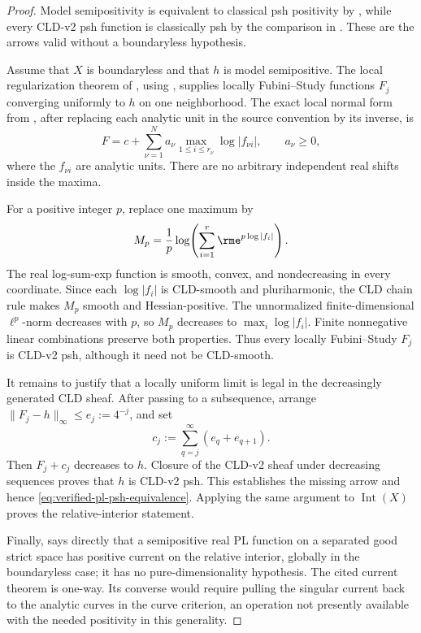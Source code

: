 \begin{proof}
Model semipositivity is equivalent to classical psh positivity by
\cite[Theorem~4.3]{GR25Classical}, while every CLD-v2 psh function is
classically psh by the comparison in \cite[\S1.2]{GR25Classical}.  These are
the arrows valid without a boundaryless hypothesis.

Assume that \(X\) is boundaryless and that \(h\) is model semipositive.  The
local regularization theorem of \cite[Introduction and Theorem~5.3]{GR25PL},
using \cite[Proposition~7.10]{GJR26}, supplies locally Fubini--Study functions
\(F_j\) converging uniformly to \(h\) on one neighborhood.  The exact local
normal form from \cite[\S7.9]{GJR26}, after replacing each analytic unit in
the source convention by its inverse, is
\[
 F=c+\sum_{\nu=1}^{N}a_\nu
       \max_{1\leq i\leq r_\nu}\log|f_{\nu i}|,
 \qquad a_\nu\geq0,
\]
where the \(f_{\nu i}\) are analytic units.  There are no arbitrary
independent real shifts inside the maxima.

For a positive integer \(p\), replace one maximum by
\[
 M_p=\frac1p\log\!\left(
             \sum_{i=1}^{r}\rme^{p\log|f_i|}\right).
\]
The real log-sum-exp function is smooth, convex, and nondecreasing in every
coordinate.  Since each \(\log|f_i|\) is CLD-smooth and pluriharmonic, the CLD
chain rule makes \(M_p\) smooth and Hessian-positive.  The unnormalized
finite-dimensional \(\ell^p\)-norm decreases with \(p\), so \(M_p\) decreases
to \(\max_i\log|f_i|\).  Finite nonnegative linear combinations preserve both
properties.  Thus every locally Fubini--Study \(F_j\) is CLD-v2 psh, although
it need not be CLD-smooth.

It remains to justify that a locally uniform limit is legal in the
decreasingly generated CLD sheaf.  After passing to a subsequence, arrange
\(\lVert F_j-h\rVert_\infty\leq e_j:=4^{-j}\), and set
\[
 c_j:=\sum_{q=j}^{\infty}(e_q+e_{q+1}).
\]
Then \(F_j+c_j\) decreases to \(h\).  Closure of the CLD-v2 sheaf under
decreasing sequences proves that \(h\) is CLD-v2 psh.  This establishes the
missing arrow and hence \eqref{eq:verified-pl-psh-equivalence}.  Applying the
same argument to \(\operatorname{Int}(X)\) proves the relative-interior
statement.

Finally, \cite[Theorem~7.14]{GJR26} says directly that a semipositive real PL
function on a separated good strict space has positive current on the
relative interior, globally in the boundaryless case; it has no
pure-dimensionality hypothesis.  The cited current theorem is one-way.  Its
converse would require pulling the singular current back to the analytic
curves in the curve criterion, an operation not presently available with the
needed positivity in this generality.
\end{proof}

